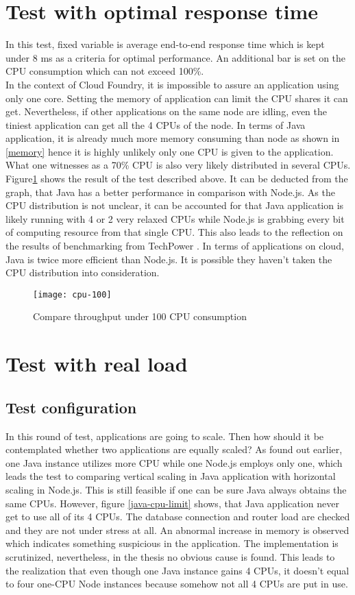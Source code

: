 \section{Test with optimal response time}
In this test, fixed variable is average end-to-end response time which is kept under 8 ms  as a criteria for optimal performance. An additional bar is set on the CPU consumption which can not exceed 100\%. \\
In the context of Cloud Foundry, it is impossible to assure an application using only one core. Setting the memory of application can limit the CPU shares it can get. Nevertheless, if other applications on the same node are idling, even the tiniest application can get all the 4 CPUs of the node. In terms of Java application, it is already much more memory consuming than node as shown in \ref{memory} hence it is highly unlikely only one CPU is given to the application. What one witnesses as a 70\% CPU is also very likely distributed in several CPUs.\\
Figure\ref{cpu-100} shows the result of the test described above. It can be deducted from the graph, that Java has a better performance in comparison with Node.js. As the CPU distribution is not unclear,  it can be accounted for that Java application is likely running with 4 or 2 very relaxed CPUs while Node.js is grabbing every bit of computing resource from that single CPU. This also leads to the reflection on the results of benchmarking from TechPower \citep{benchmark}. In terms of applications on cloud, Java is twice more efficient than Node.js. It is possible they haven't taken the CPU distribution into consideration. 

\begin{figure}[h]
	\centering
	\texttt{[image: cpu-100]}
	\caption{Compare throughput under 100 CPU consumption}
	\label{cpu-100}
\end{figure}

\section{Test with real load}
\subsection{Test configuration}
 In this round of test, applications are going to scale. Then how should it be contemplated whether two applications are equally scaled? As found out earlier, one Java instance utilizes more CPU while one Node.js employs only one, which leads the test to comparing vertical scaling in Java application with horizontal scaling in Node.js. This is still feasible if one can be sure Java always obtains the same CPUs. However, figure \ref{java-cpu-limit} shows, that Java application never get to use all of its 4 CPUs. The database connection and router load are checked and they are not under stress at all.  An abnormal increase in memory is observed which indicates something suspicious in the application. The implementation is scrutinized, nevertheless, in the thesis no obvious cause is found. This leads to the realization that even though one Java instance gains 4 CPUs, it doesn't equal to four one-CPU Node instances because somehow not all 4 CPUs are put in use. 
 
